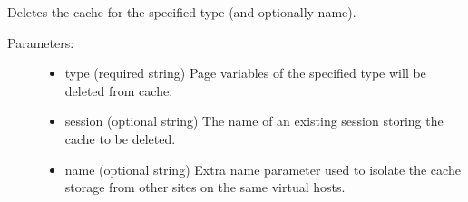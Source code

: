 \documentclass[letterpaper,10pt,english]{sphinxmanual}
\begin{document}

\begin{fulllineitems}
\label{knop_cache:knop_cachedelete}
\end{fulllineitems}


\begin{fulllineitems}
Deletes the cache for the specified type (and optionally name).
\begin{description}
\item[{Parameters:}] \leavevmode\begin{itemize}
\item {} 
type (required string)
Page variables of the specified type will be deleted from cache.

\item {} 
session (optional string)
The name of an existing session storing the cache to be deleted.

\item {} 
name (optional string)
Extra name parameter used to isolate the cache storage from other sites on
the same virtual hosts.

\end{itemize}

\end{description}

\end{fulllineitems}


\begin{fulllineitems}
\label{knop_cache:knop_cachefetch}
\end{fulllineitems}

\end{document}
